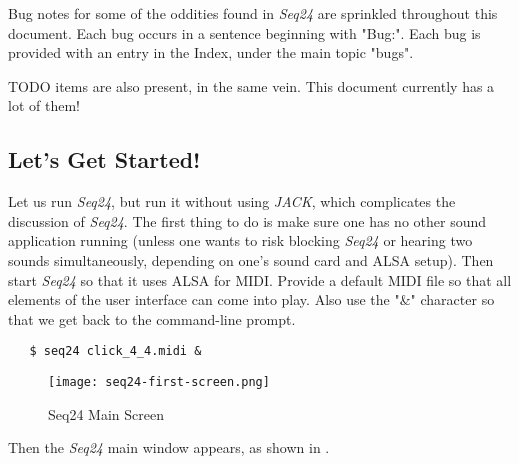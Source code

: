 \documentclass[
 11pt,
 twoside,
 a4paper,
 headinclude,
 footinclude,
 final                                 %
]{article}
\begin{document}
   Bug notes
   for some of the oddities found in \textsl{Seq24} are
   sprinkled throughout this document.
   Each bug occurs in a sentence beginning with "Bug:".
   Each bug is provided with an entry in the Index, under the
   main topic "bugs".

   TODO items
   are also present, in the same vein.
   This document currently has a lot of them!

\subsection{Let's Get Started!}
\label{subsec:introduction_lets_get_started}

   Let us run \textsl{Seq24}, but run it without using \textsl{JACK}, which
   complicates the discussion of \textsl{Seq24}.  The first
   thing to do is make sure one has no other sound application running
   (unless one wants to risk blocking \textsl{Seq24} or hearing two sounds
   simultaneously, depending on one's sound card and ALSA setup).
   Then start \textsl{Seq24} so that it uses ALSA for
   MIDI.  Provide a default MIDI file so that all elements of the user
   interface can come into play.
   Also use the "\&" character so that we get back to the
   command-line prompt.

\begin{verbatim}
   $ seq24 click_4_4.midi &
\end{verbatim}

\begin{figure}[H]
   \centering 
   \texttt{[image: seq24-first-screen.png]}
   \caption{Seq24 Main Screen}
   \label{fig:seq24_main_screen}
\end{figure}

   
   Then the \textsl{Seq24} main window appears, as shown in
   .









\end{document}
